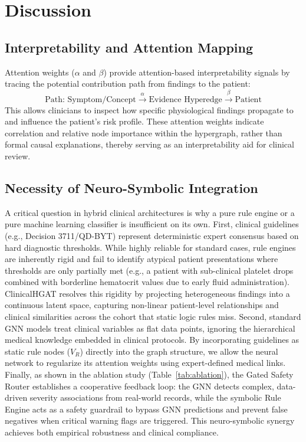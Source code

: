 \documentclass[conference]{IEEEtran}
\begin{document}
\section{Discussion}
\label{sec:discussion}

\subsection{Interpretability and Attention Mapping}
Attention weights ($\alpha$ and $\beta$) provide attention-based interpretability signals by tracing the potential contribution path from findings to the patient:
\begin{equation}
    \text{Path: } \text{Symptom/Concept} \xrightarrow{\alpha} \text{Evidence Hyperedge} \xrightarrow{\beta} \text{Patient}
\end{equation}
This allows clinicians to inspect how specific physiological findings propagate to and influence the patient's risk profile. These attention weights indicate correlation and relative node importance within the hypergraph, rather than formal causal explanations, thereby serving as an interpretability aid for clinical review.

\subsection{Necessity of Neuro-Symbolic Integration}
A critical question in hybrid clinical architectures is why a pure rule engine or a pure machine learning classifier is insufficient on its own. 
First, clinical guidelines (e.g., Decision 3711/QD-BYT) represent deterministic expert consensus based on hard diagnostic thresholds. While highly reliable for standard cases, rule engines are inherently rigid and fail to identify atypical patient presentations where thresholds are only partially met (e.g., a patient with sub-clinical platelet drops combined with borderline hematocrit values due to early fluid administration). ClinicalHGAT resolves this rigidity by projecting heterogeneous findings into a continuous latent space, capturing non-linear patient-level relationships and clinical similarities across the cohort that static logic rules miss.
Second, standard GNN models treat clinical variables as flat data points, ignoring the hierarchical medical knowledge embedded in clinical protocols. By incorporating guidelines as static rule nodes ($V_R$) directly into the graph structure, we allow the neural network to regularize its attention weights using expert-defined medical links.
Finally, as shown in the ablation study (Table~\ref{tab:ablation}), the Gated Safety Router establishes a cooperative feedback loop: the GNN detects complex, data-driven severity associations from real-world records, while the symbolic Rule Engine acts as a safety guardrail to bypass GNN predictions and prevent false negatives when critical warning flags are triggered. This neuro-symbolic synergy achieves both empirical robustness and clinical compliance.
\end{document}
